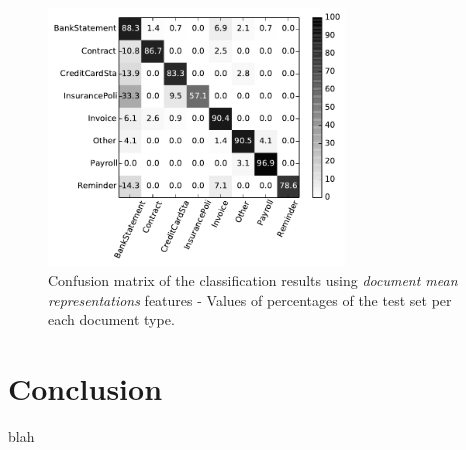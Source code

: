 \begin{figure}[h]
    \centering
    \includegraphics[width=0.7\textwidth]{images/004-xvalidaton-handcrafted.pdf}
    \caption{Confusion matrix of the classification results  using \textit{document mean
      representations} features - Values of percentages of the test set per
    each document type.}
    \label{fig:confusion-matrix-handcrafted}
\end{figure}





\section{Conclusion}
\label{sec:w2v4tc_conclusion}
blah 


 










